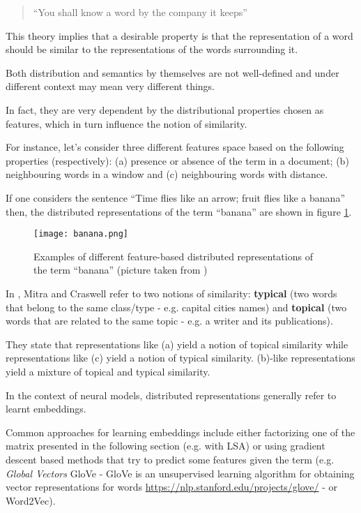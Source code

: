 \begin{quote}
``You shall know a word by the company it keeps'' \cite{firth}
\end{quote}

This theory implies that a desirable property is that the representation of a word should be similar to the representations of the words surrounding it.

Both distribution and semantics by themselves are not well-defined and under different context may mean very different things.

In fact, they are very dependent by the distributional properties chosen as features, which in turn influence the notion of similarity.

For instance, let's consider three different features space based on the following properties (respectively): (a) presence or absence of the term in a document; (b) neighbouring words in a window and (c) neighbouring words with distance.

If one considers the sentence ``Time flies like an arrow; fruit flies like a banana'' then, the distributed representations of the term ``banana'' are shown in figure \ref{fig:banana}.

\begin{figure}
  \centering
  \texttt{[image: banana.png]}
  \caption{Examples of different feature-based distributed representations of the term ``banana'' (picture taken from \cite{nn4ir})}
  \label{fig:banana}
\end{figure}

In \cite{nn4ir}, Mitra and Craswell refer to two notions of similarity: \textbf{typical} (two words that belong to the same class/type - e.g. capital cities names) and \textbf{topical} (two words that are related to the same topic - e.g. a writer and its publications).

They state that representations like (a) yield a notion of topical similarity while representations like (c) yield a notion of typical similarity. (b)-like representations yield a mixture of topical and typical similarity.

In the context of neural models, distributed representations generally refer to learnt embeddings.

Common approaches for learning embeddings include either factorizing one of the matrix presented in the following section (e.g. with LSA) or using gradient descent based methods that try to predict some features given the term (e.g. \textit{Global Vectors} GloVe \cite{Glove} - GloVe is an unsupervised learning algorithm for obtaining vector representations for words \url{https://nlp.stanford.edu/projects/glove/} - or Word2Vec).

